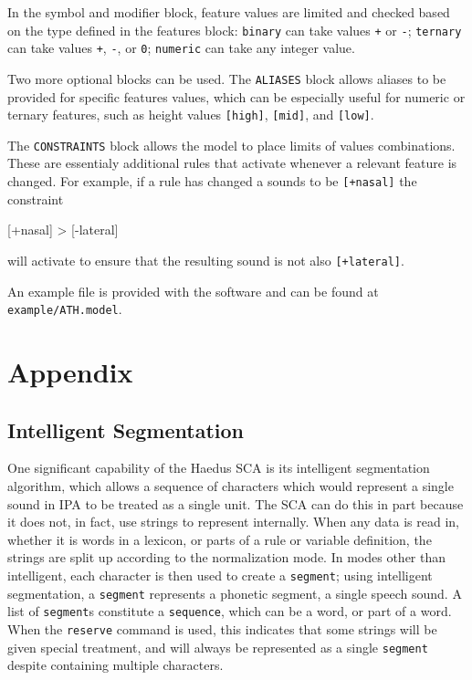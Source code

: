 \documentclass[10pt,letterpaper]{article}
\newcounter{excounter}
\newenvironment{vex}[1]{
  \vspace{1em}
  \refstepcounter{excounter}
  \noindent\makebox[3em][l]{(\arabic{excounter}\label{#1})}
  \minipage{\textwidth}
  \verbatim
}{
  \endverbatim
  \endminipage
  \vspace{1em}
}
\begin{document}
In the symbol and modifier block, feature values are limited and checked based on the type defined in the features block: \texttt{binary} can take values \texttt{+} or \texttt{-}; \texttt{ternary} can take values \texttt{+}, \texttt{-}, or \texttt{0}; \texttt{numeric} can take any integer value.

Two more optional blocks can be used. The \texttt{ALIASES} block allows aliases to be provided for specific features values, which can be especially useful for numeric or ternary features, such as height values \texttt{[high]}, \texttt{[mid]}, and \texttt{[low]}.

The \texttt{CONSTRAINTS} block allows the model to place limits of values combinations. These are essentialy additional rules that activate whenever a relevant feature is changed. For example, if a rule has changed a sounds to be \texttt{[+nasal]} the constraint

\begin{vex}{ex:constraint}
[+nasal] > [-lateral]
\end{vex}
\noindent
will activate to ensure that the resulting sound is not also \texttt{[+lateral]}.

An example file is provided with the software and can be found at \texttt{example/ATH.model}.


\section{Appendix}
\label{sec:appendix}

\subsection{Intelligent Segmentation}
\label{sub:segmentation}
One significant capability of the Haedus SCA is its intelligent segmentation algorithm, which allows a sequence of characters which would represent a single sound in IPA to be treated as a single unit. The SCA can do this in part because it does not, in fact, use strings to represent internally. When any data is read in, whether it is words in a lexicon, or parts of a rule or variable definition, the strings are split up according to the normalization mode. In modes other than intelligent, each character is then used to create a \texttt{segment}; using intelligent segmentation, a \texttt{segment} represents a phonetic segment, a single speech sound. A list of \texttt{segment}s constitute a \texttt{sequence}, which can be a word, or part of a word. When the \texttt{reserve} command is used, this indicates that some strings will be given special treatment, and will always be represented as a single \texttt{segment} despite containing multiple characters.
\end{document}
